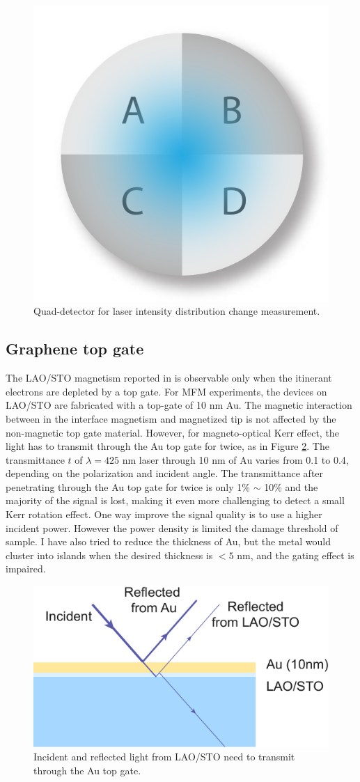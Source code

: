 \documentclass[pdflatex, sectionletters, 12pt]{pittetd}    %
\begin{document}
\begin{figure}[h!]
	\centering
	\includegraphics[width=.25\textwidth]{Drawing/Quad.pdf}
	\caption{Quad-detector for laser intensity distribution change measurement.}
	\label{FIG:Quad}
\end{figure}

\subsection{Graphene top gate}

The LAO/STO magnetism reported in \cite{bi2014room} is observable only when the itinerant electrons are depleted by a top gate. For MFM experiments, the devices on LAO/STO are fabricated with a top-gate of 10 nm Au. The magnetic interaction between in the interface magnetism and magnetized tip is not affected by the non-magnetic top gate material. However, for magneto-optical Kerr effect, the light has to transmit through the Au top gate for twice, as in Figure \ref{FIG:KerrTopGate}. The transmittance $t$ of $\lambda = 425$ nm laser through 10 nm of Au varies from 0.1 to 0.4, depending on the polarization and incident angle\cite{smith1986noble}. The transmittance after penetrating through the Au top gate for twice is only 1\% $\sim$ 10\% and the majority of the signal is lost, making it even more challenging to detect a small Kerr rotation effect. One way improve the signal quality is to use a higher incident power. However the power density is limited the damage threshold of sample. I have also tried to reduce the thickness of Au, but the metal would cluster into islands when the desired thickness is $< 5$ nm, and the gating effect is impaired.
\\

\begin{figure}[h!]
	\centering
	\includegraphics[width=.55\textwidth]{Drawing/KerrTopGate.pdf}
	\caption{Incident and reflected light from LAO/STO need to transmit through the Au top gate.}
	\label{FIG:KerrTopGate}
\end{figure}
\end{document}
